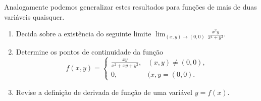 Analogamente podemos generalizar estes resultados para funções de mais de duas variáveis quaisquer.
\newpage

\begin{casab}{}{}
\begin{enumerate}
\item Decida sobre a existência do seguinte limite $\displaystyle\lim_{(x,y)\to(0,0)}\frac{x^2y}{x^4+y^2}$.
		
\item Determine os pontos de continuidade da função
		\[f(x,y)=\begin{cases}
		\displaystyle\frac{xy}{x^2+xy+y^2}, & (x,y)\neq (0,0),\\
			0, & (x,y=(0,0).
		\end{cases}\]
		
\item Revise a definição de derivada de função de uma variável $y=f(x)$.
	\end{enumerate}
\end{casab}

